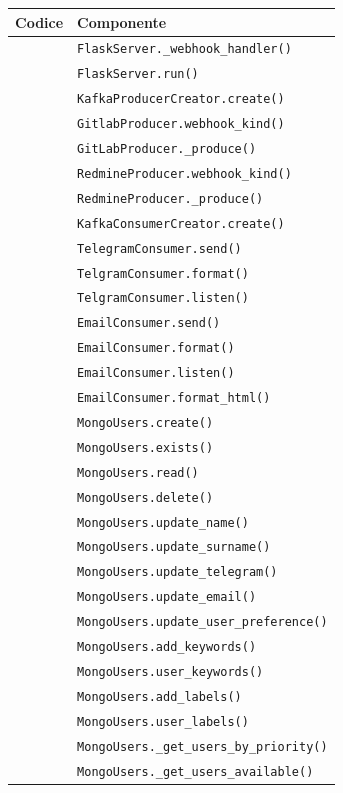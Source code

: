 		\begin{table}[H]
			\centering
			{\def\arraystretch{1.4}
			\begin{tabularx}{0.6\textwidth}{cX}
				\rowcolor{white}
				\textbf{Codice} & \textbf{Componente} \\
				\toprule
				\addtotu & \texttt{FlaskServer.\_webhook\_handler()} \\
				\addtotu & \texttt{FlaskServer.run()} \\

				\addtotu & \texttt{KafkaProducerCreator.create()} \\
				\addtotu & \texttt{GitlabProducer.webhook\_kind()} \\
				\addtotu & \texttt{GitLabProducer.\_produce()} \\
				\addtotu & \texttt{RedmineProducer.webhook\_kind()} \\
				\addtotu & \texttt{RedmineProducer.\_produce()} \\

				\addtotu & \texttt{KafkaConsumerCreator.create()} \\
				\addtotu & \texttt{TelegramConsumer.send()} \\
				\addtotu & \texttt{TelgramConsumer.format()} \\
				\addtotu & \texttt{TelgramConsumer.listen()} \\

				\addtotu & \texttt{EmailConsumer.send()} \\
				\addtotu & \texttt{EmailConsumer.format()} \\
				\addtotu & \texttt{EmailConsumer.listen()} \\
				\addtotu & \texttt{EmailConsumer.format\_html()} \\

				\addtotu & \texttt{MongoUsers.create()} \\
				\addtotu & \texttt{MongoUsers.exists()} \\
				\addtotu & \texttt{MongoUsers.read()} \\
				\addtotu & \texttt{MongoUsers.delete()} \\
				\addtotu & \texttt{MongoUsers.update\_name()} \\
				\addtotu & \texttt{MongoUsers.update\_surname()} \\
				\addtotu & \texttt{MongoUsers.update\_telegram()} \\
				\addtotu & \texttt{MongoUsers.update\_email()} \\
				\addtotu & \texttt{MongoUsers.update\_user\_preference()} \\
				\addtotu & \texttt{MongoUsers.add\_keywords()} \\
				\addtotu & \texttt{MongoUsers.user\_keywords()} \\
				\addtotu & \texttt{MongoUsers.add\_labels()} \\
				\addtotu & \texttt{MongoUsers.user\_labels()} \\
				\addtotu & \texttt{MongoUsers.\_get\_users\_by\_priority()} \\
				\addtotu & \texttt{MongoUsers.\_get\_users\_available()} \\


\end{tabularx}}
\end{table}
